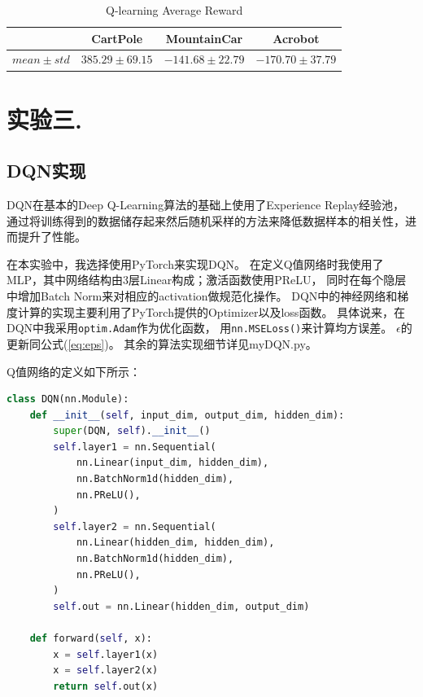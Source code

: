 \documentclass[a4paper,UTF8]{article}
\theoremstyle{definition}
\begin{document}
\begin{table}[H]
	\centering
	\caption{Q-learning Average Reward}\label{tab:reward-ql}
	\begin{tabular}{c|ccc}
		\toprule
		& CartPole & MountainCar & Acrobot \\
		\midrule
		$mean \pm std$ &
		$385.29 \pm 69.15$ &
		$-141.68 \pm 22.79$ &
		$-170.70 \pm 37.79$ \\
		\bottomrule
	\end{tabular}
\end{table}

\section*{实验三.}

\subsection*{DQN实现}

DQN在基本的Deep Q-Learning算法的基础上使用了Experience Replay经验池，
通过将训练得到的数据储存起来然后随机采样的方法来降低数据样本的相关性，进而提升了性能。

在本实验中，我选择使用PyTorch来实现DQN。
在定义Q值网络时我使用了MLP，其中网络结构由3层Linear构成；激活函数使用PReLU，
同时在每个隐层中增加Batch Norm来对相应的activation做规范化操作。
DQN中的神经网络和梯度计算的实现主要利用了PyTorch提供的Optimizer以及loss函数。
具体说来，在DQN中我采用\lstinline[language=Python]{optim.Adam}作为优化函数，
用\lstinline[language=Python]{nn.MSELoss()}来计算均方误差。
$\epsilon$的更新同公式(\ref{eq:eps})。
其余的算法实现细节详见myDQN.py。

Q值网络的定义如下所示：

\begin{lstlisting}[language=Python]
class DQN(nn.Module):
    def __init__(self, input_dim, output_dim, hidden_dim):
        super(DQN, self).__init__()
        self.layer1 = nn.Sequential(
            nn.Linear(input_dim, hidden_dim),
            nn.BatchNorm1d(hidden_dim),
            nn.PReLU(),
        )
        self.layer2 = nn.Sequential(
            nn.Linear(hidden_dim, hidden_dim),
            nn.BatchNorm1d(hidden_dim),
            nn.PReLU(),
        )
        self.out = nn.Linear(hidden_dim, output_dim)

    def forward(self, x):
        x = self.layer1(x)
        x = self.layer2(x)
        return self.out(x)
\end{lstlisting}
\end{document}
